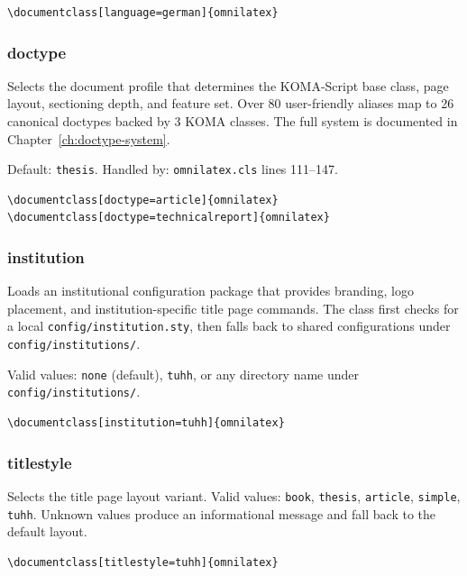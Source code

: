 \begin{verbatim}
\documentclass[language=german]{omnilatex}
\end{verbatim}

\subsubsection{\textsf{doctype}}

Selects the document profile that determines the KOMA-Script base class,
page layout, sectioning depth, and feature set.  Over 80 user-friendly
aliases map to 26 canonical doctypes backed by 3 KOMA classes.
The full system is documented in Chapter~\ref{ch:doctype-system}.

Default: \texttt{thesis}.  Handled by: \texttt{omnilatex.cls} lines
111--147.

\begin{verbatim}
\documentclass[doctype=article]{omnilatex}
\documentclass[doctype=technicalreport]{omnilatex}
\end{verbatim}

\subsubsection{\textsf{institution}}

Loads an institutional configuration package that provides branding,
logo placement, and institution-specific title page commands.  The class
first checks for a local \texttt{config/institution.sty}, then falls back
to shared configurations under \texttt{config/institutions/}.

Valid values: \texttt{none} (default), \texttt{tuhh}, or any directory
name under \texttt{config/institutions/}.

\begin{verbatim}
\documentclass[institution=tuhh]{omnilatex}
\end{verbatim}

\subsubsection{\textsf{titlestyle}}

Selects the title page layout variant.  Valid values: \texttt{book},
\texttt{thesis}, \texttt{article}, \texttt{simple}, \texttt{tuhh}.
Unknown values produce an informational message and fall back to the
default layout.

\begin{verbatim}
\documentclass[titlestyle=tuhh]{omnilatex}
\end{verbatim}

